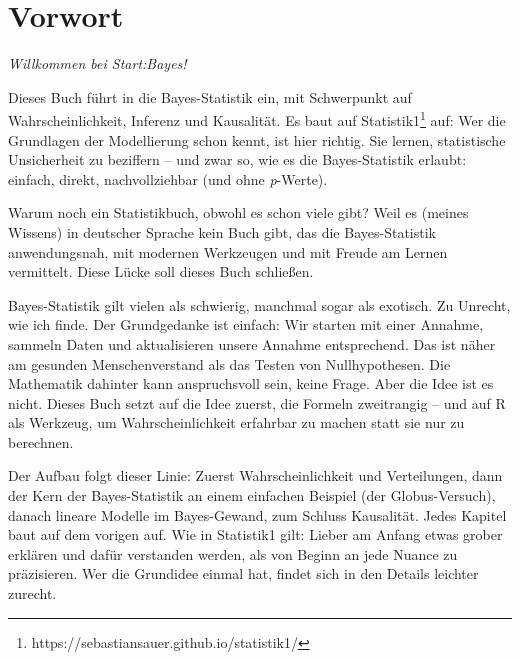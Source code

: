\documentclass[
  ngerman,
  letterpaper,
  twoside,
  open=any]{scrbook}
\theoremstyle{definition}
\theoremstyle{plain}
\theoremstyle{definition}
\theoremstyle{definition}
\theoremstyle{definition}
\theoremstyle{definition}
\theoremstyle{remark}
\begin{document}


\mainmatter
{}

\chapter*{Vorwort}\label{vorwort}


\setcounter{page}{7}

\emph{Willkommen bei Start:Bayes!}

Dieses Buch führt in die Bayes-Statistik ein, mit Schwerpunkt auf
Wahrscheinlichkeit, Inferenz und Kausalität. Es baut auf
Statistik1\footnote{https://sebastiansauer.github.io/statistik1/} auf:
Wer die Grundlagen der Modellierung schon kennt, ist hier richtig. Sie
lernen, statistische Unsicherheit zu beziffern -- und zwar so, wie es
die Bayes-Statistik erlaubt: einfach, direkt, nachvollziehbar (und ohne
\emph{p}-Werte).

Warum noch ein Statistikbuch, obwohl es schon viele gibt? Weil es
(meines Wissens) in deutscher Sprache kein Buch gibt, das die
Bayes-Statistik anwendungsnah, mit modernen Werkzeugen und mit Freude am
Lernen vermittelt. Diese Lücke soll dieses Buch schließen.

Bayes-Statistik gilt vielen als schwierig, manchmal sogar als exotisch.
Zu Unrecht, wie ich finde. Der Grundgedanke ist einfach: Wir starten mit
einer Annahme, sammeln Daten und aktualisieren unsere Annahme
entsprechend. Das ist näher am gesunden Menschenverstand als das Testen
von Nullhypothesen. Die Mathematik dahinter kann anspruchsvoll sein,
keine Frage. Aber die Idee ist es nicht. Dieses Buch setzt auf die Idee
zuerst, die Formeln zweitrangig -- und auf R als Werkzeug, um
Wahrscheinlichkeit erfahrbar zu machen statt sie nur zu berechnen.

Der Aufbau folgt dieser Linie: Zuerst Wahrscheinlichkeit und
Verteilungen, dann der Kern der Bayes-Statistik an einem einfachen
Beispiel (der Globus-Versuch), danach lineare Modelle im Bayes-Gewand,
zum Schluss Kausalität. Jedes Kapitel baut auf dem vorigen auf. Wie in
Statistik1 gilt: Lieber am Anfang etwas grober erklären und dafür
verstanden werden, als von Beginn an jede Nuance zu präzisieren. Wer die
Grundidee einmal hat, findet sich in den Details leichter zurecht.
\end{document}
